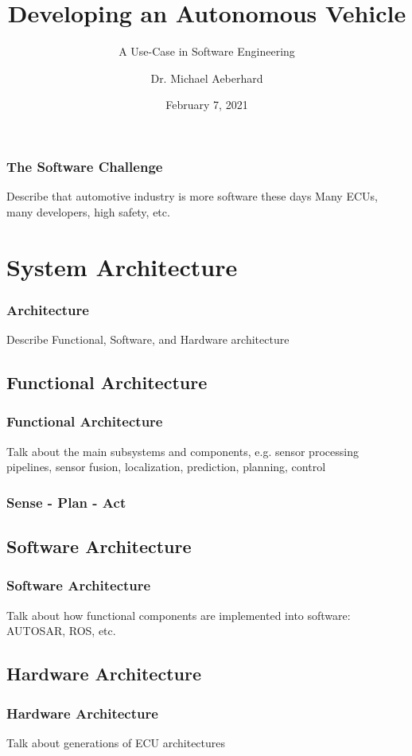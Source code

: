 \documentclass{beamer}
\title{Developing an Autonomous Vehicle}
\subtitle{A Use-Case in Software Engineering}
\author{Dr. Michael Aeberhard}
\institute{Apex.AI}
\date{February 7, 2021}
\begin{document}
\frame{\titlepage}




\begin{frame}
\frametitle{The Software Challenge}
Describe that automotive industry is more software these days
Many ECUs, many developers, high safety, etc.
\end{frame}

\section{System Architecture}

\begin{frame}
\frametitle{Architecture}
Describe Functional, Software, and Hardware architecture
\end{frame}

\subsection{Functional Architecture}

\begin{frame}
\frametitle{Functional Architecture}
Talk about the main subsystems and components, e.g. sensor processing pipelines,
sensor fusion, localization, prediction, planning, control
\end{frame}

\begin{frame}
\frametitle{Sense - Plan - Act}
\end{frame}

\subsection{Software Architecture}

\begin{frame}
\frametitle{Software Architecture}
Talk about how functional components are implemented into software:
AUTOSAR, ROS, etc.
\end{frame}

\subsection{Hardware Architecture}

\begin{frame}
\frametitle{Hardware Architecture}
Talk about generations of ECU architectures
\end{frame}
\end{document}
